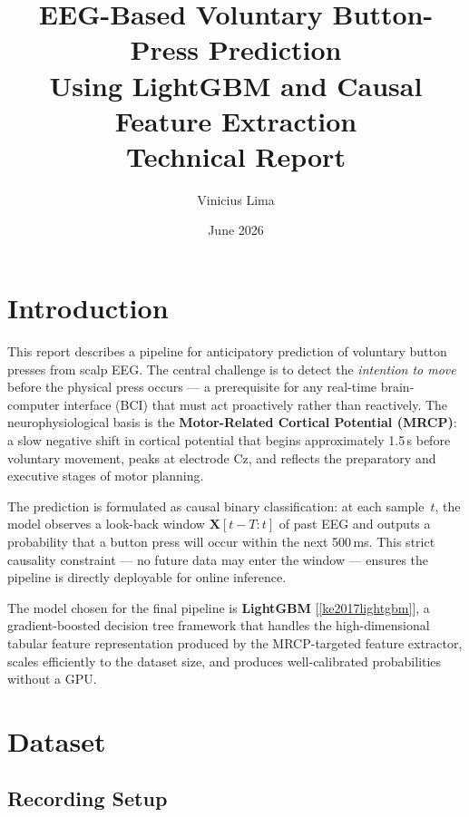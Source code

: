 \documentclass[12pt,a4paper]{article}
\title{\textbf{EEG-Based Voluntary Button-Press Prediction\\
       Using LightGBM and Causal Feature Extraction}\\[0.5em]
       \large Technical Report}
\author{Vinicius Lima}
\date{June 2026}
\begin{document}
\maketitle
\tableofcontents
\newpage

\section{Introduction}

This report describes a pipeline for anticipatory prediction of voluntary
button presses from scalp EEG. The central challenge is to detect the
\emph{intention to move} before the physical press occurs — a prerequisite
for any real-time brain-computer interface (BCI) that must act proactively
rather than reactively. The neurophysiological basis is the
\textbf{Motor-Related Cortical Potential (MRCP)}: a slow negative shift in
cortical potential that begins approximately 1.5\,s before voluntary
movement, peaks at electrode Cz, and reflects the preparatory and
executive stages of motor planning.

The prediction is formulated as causal binary classification: at each
sample~$t$, the model observes a look-back window $\mathbf{X}[t-T:t]$ of
past EEG and outputs a probability that a button press will occur within
the next 500\,ms. This strict causality constraint — no future data may
enter the window — ensures the pipeline is directly deployable for
online inference.

The model chosen for the final pipeline is \textbf{LightGBM}
[\ref{ke2017lightgbm}], a gradient-boosted decision tree framework that
handles the high-dimensional tabular feature representation produced by the
MRCP-targeted feature extractor, scales efficiently to the dataset size, and
produces well-calibrated probabilities without a GPU.

\section{Dataset}

\subsection{Recording Setup}
\end{document}
